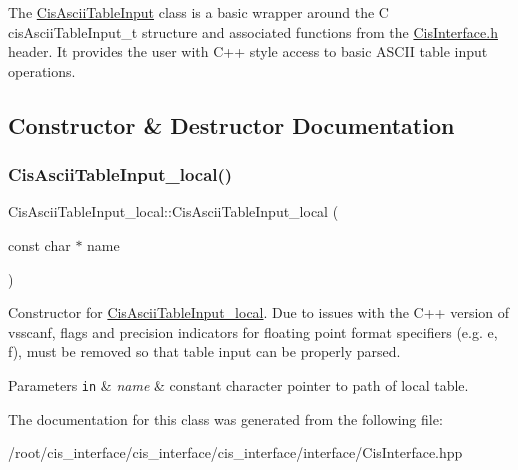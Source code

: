The \mbox{\hyperlink{classCisAsciiTableInput}{Cis\+Ascii\+Table\+Input}} class is a basic wrapper around the C cis\+Ascii\+Table\+Input\+\_\+t structure and associated functions from the \mbox{\hyperlink{CisInterface_8h_source}{Cis\+Interface.\+h}} header. It provides the user with C++ style access to basic A\+S\+C\+II table input operations. 

\subsection{Constructor \& Destructor Documentation}
\mbox{\label{classCisAsciiTableInput__local_a1f7f46702f688c571b4c86617ef5035d}} 
\subsubsection{\texorpdfstring{Cis\+Ascii\+Table\+Input\+\_\+local()}{CisAsciiTableInput\_local()}}
{\footnotesize\ttfamily Cis\+Ascii\+Table\+Input\+\_\+local\+::\+Cis\+Ascii\+Table\+Input\+\_\+local (\begin{DoxyParamCaption}\item[{const char $\ast$}]{name }\end{DoxyParamCaption})\hspace{0.3cm}{\ttfamily [inline]}}



Constructor for \mbox{\hyperlink{classCisAsciiTableInput__local}{Cis\+Ascii\+Table\+Input\+\_\+local}}. Due to issues with the C++ version of vsscanf, flags and precision indicators for floating point format specifiers (e.\+g. e, f), must be removed so that table input can be properly parsed. 


\begin{DoxyParams}[1]{Parameters}
\mbox{\tt in}  & {\em name} & constant character pointer to path of local table. \\
\hline
\end{DoxyParams}


The documentation for this class was generated from the following file\+:\begin{DoxyCompactItemize}
\item 
/root/cis\+\_\+interface/cis\+\_\+interface/cis\+\_\+interface/interface/Cis\+Interface.\+hpp\end{DoxyCompactItemize}
